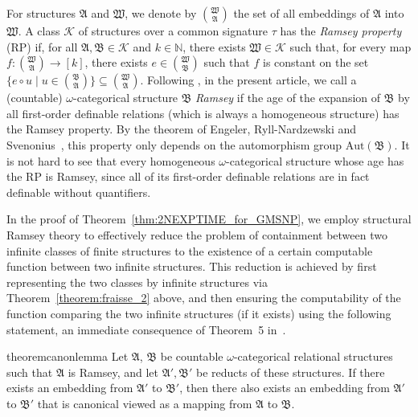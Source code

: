\documentclass[oneside,reqno,12pt]{amsart}
\theoremstyle{plain}
\theoremstyle{remark}
\newcommand{\struct}[1]{\mathfrak{#1}}
\newcommand{\Aut}{\ensuremath{\mathrm{Aut}}\xspace}
\begin{document}
{For structures $\struct{A}$ and $\struct{W}$, we denote by $\binom{\struct{W}}{\struct{A}}$ the set of all embeddings of $\struct{A}$ into $\struct{W}$.
A class $\mathcal{K}$ of structures over a common signature $\tau$ has the \emph{Ramsey property} (RP) if,  for all $\struct{A},\struct{B}\in \mathcal{K}$ and $k\in \mathbb{N}$, there exists $\struct{W}\in \mathcal{K}$ such that, for every map $f\colon \binom{\struct{W}}{\struct{A}} \rightarrow [k]$, there exists $e\in \binom{\struct{W}}{\struct{B}}$ such that $f$ is constant on the set $\bigl\{e\circ u\;|\; u\in \binom{\struct{B}}{\struct{A}}\bigr\} \subseteq \binom{\struct{W}}{\struct{A}}$.  
Following \cite[Definition~5.3]{bodirsky2018_article}, in the present article, we call a (countable) $\omega$-categorical structure $\struct{B}$  \emph{Ramsey} if the age of the  expansion of $\struct{B}$ by all first-order definable relations (which is always a homogeneous structure) has the Ramsey property. 
By the theorem of Engeler, Ryll-Nardzewski and Svenonius~\cite{hodges_book}, this property only depends on the automorphism group $\Aut(\struct{B})$.   
It is not hard to see that every homogeneous $\omega$-categorical structure whose age has the RP is Ramsey, since all of its first-order definable relations are in fact definable without quantifiers.


In the proof of Theorem~\ref{thm:2NEXPTIME_for_GMSNP}, we employ structural Ramsey theory to effectively reduce the problem of containment between two infinite classes of finite structures to the existence of a certain computable function between two infinite structures. This reduction is achieved by first representing the two classes by infinite structures via  Theorem~\ref{theorem:fraisse_2} above, and then ensuring the computability of the function comparing the two infinite structures (if it exists) using the following statement, an immediate consequence of Theorem~5 in~\cite{bodirsky_pinsker_ramsey_canonical}. 

\begin{restatable}{theorem}{canonlemma}    \label{th:canonical_ramsey} 
 Let $\struct{A}$, $\struct{B}$ be countable $\omega$-categorical   relational structures such that $\struct{A}$ is Ramsey, and let $\struct{A}',\struct{B}'$ be reducts of these structures.  If there exists an embedding from $\struct{A}'$ to  $\struct{B}'$, then there also exists an embedding from $\struct{A}'$ to $\struct{B}'$ that is canonical viewed as a mapping from $\struct{A}$  to $\struct{B}$.     
\end{restatable} 



}
\end{document}
